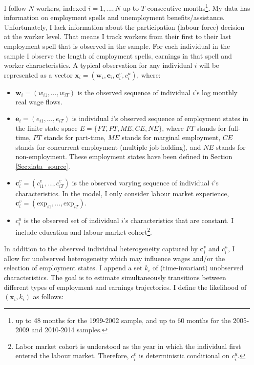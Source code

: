 \documentclass[12pt, a4paper]{article}
\begin{document}
I follow $N$ workers, indexed $i=1,...,N$ up to $T$ consecutive months\footnote{up to 48 months for the 1999-2002 sample, and up to 60 months for the 2005-2009 and  2010-2014 samples.}. My data has information on employment spells and unemployment benefits/assistance. Unfortunately, I lack information about the participation (labour force) decision at the worker level. That means I track workers from their first to their last employment spell that is observed in the sample. For each individual in the sample I observe the length of employment spells, earnings in that spell and worker characteristics. A typical observation for any individual $i$ will be represented as a vector $\textbf{x}_i=(\textbf{w}_i,\textbf{e}_i,\textbf{c}_i^v,c_i^u)$, where:
\vspace{0.2 cm}
\begin{itemize}
\setlength{\itemsep}{0.2 cm}
\item $\textbf{w}_i=(w_{i1},...,w_{iT})$ is the observed sequence of individual $i$'s log monthly real wage flows.
\item $\textbf{e}_i=(e_{i1},...,e_{iT})$  is individual $i$'s observed sequence of employment states in the finite state space $E=\{FT,PT,ME,CE,NE\}$, where $FT$ stands for full-time, $PT$ stands for part-time, $ME$ stands for marginal employment, $CE$ stands for concurrent employment (multiple job holding), and $NE$ stands for non-employment. These employment states have been defined in Section \ref{Sec:data_source}. 
\item $\textbf{c}_i^v = (c^v_{i1},...,c^v_{iT})$ is the observed varying sequence of individual $i$'s characteristics. In the model, I only consider labour market experience, $\textbf{c}_i^v = (\text{exp}_{i1},...,\text{exp}_{iT})$.
\item $c_i^{u}$ is the observed set of individual $i$'s characteristics that are constant. I include education and labour market cohort\footnote{Labor market cohort is understood as the year in which the individual first entered the labour market. Therefore, $c_i^v$ is deterministic conditional on $c_i^u$.}.
\end{itemize}
\vspace{0.2 cm}


In addition to the observed individual heterogeneity captured by $\textbf{c}_i^v$ and $c_i^{u}$, I allow for unobserved heterogeneity which may influence wages and/or the selection of employment states. I append a set $k_i$ of (time-invariant) unobserved characteristics. The goal is to estimate simultaneously transitions between different types of employment and earnings trajectories. I define the likelihood of $(\textbf{x}_i,k_i)$ as follows:
\end{document}
